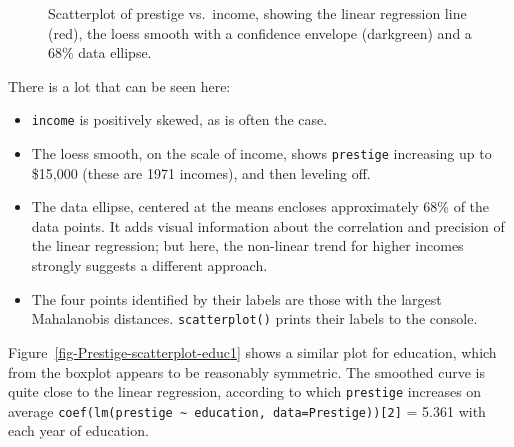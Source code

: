 \documentclass[
  letterpaper,
  10pt,
  krantz2]{krantz}
\providecommand{\tightlist}{%
  \setlength{\itemsep}{0pt}\setlength{\parskip}{0pt}}\usepackage{longtable,booktabs,array}
\begin{document}
{\begin{figure}[H]
{}

\caption{\label{fig-Prestige-scatterplot-income1}Scatterplot of prestige
vs.~income, showing the linear regression line (red), the loess smooth
with a confidence envelope (darkgreen) and a 68\% data ellipse.}

\end{figure}%

There is a lot that can be seen here:

\begin{itemize}
\tightlist
\item
  \texttt{income} is positively skewed, as is often the case.
\item
  The loess smooth, on the scale of income, shows \texttt{prestige}
  increasing up to \$15,000 (these are 1971 incomes), and then leveling
  off.
\item
  The data ellipse, centered at the means encloses approximately 68\% of
  the data points. It adds visual information about the correlation and
  precision of the linear regression; but here, the non-linear trend for
  higher incomes strongly suggests a different approach.
\item
  The four points identified by their labels are those with the largest
  Mahalanobis distances. \texttt{scatterplot()} prints their labels to
  the console.
\end{itemize}

Figure~\ref{fig-Prestige-scatterplot-educ1} shows a similar plot for
education, which from the boxplot appears to be reasonably symmetric.
The smoothed curve is quite close to the linear regression, according to
which \texttt{prestige} increases on average
\texttt{coef(lm(prestige\ \textasciitilde{}\ education,\ data=Prestige)){[}2{]}}
= 5.361 with each year of education.

}
\end{document}
